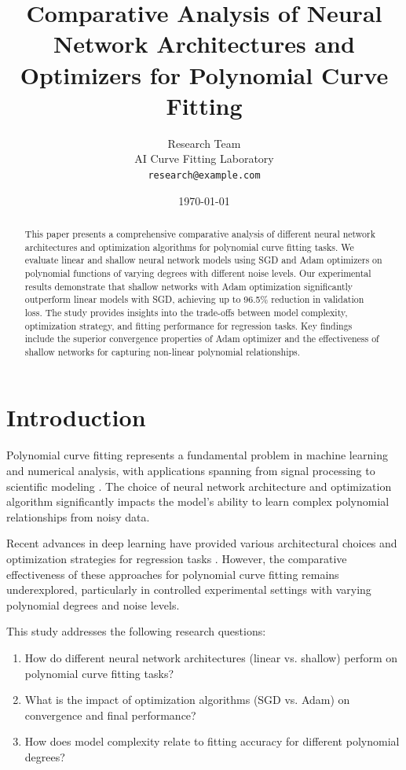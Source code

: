 \documentclass[11pt,twocolumn]{article}
\title{Comparative Analysis of Neural Network Architectures and Optimizers for Polynomial Curve Fitting}
\author{
    Research Team\\
    AI Curve Fitting Laboratory\\
    \texttt{research@example.com}
}
\date{\today}
\begin{document}
\maketitle

\begin{abstract}
This paper presents a comprehensive comparative analysis of different neural network architectures and optimization algorithms for polynomial curve fitting tasks. We evaluate linear and shallow neural network models using SGD and Adam optimizers on polynomial functions of varying degrees with different noise levels. Our experimental results demonstrate that shallow networks with Adam optimization significantly outperform linear models with SGD, achieving up to 96.5\% reduction in validation loss. The study provides insights into the trade-offs between model complexity, optimization strategy, and fitting performance for regression tasks. Key findings include the superior convergence properties of Adam optimizer and the effectiveness of shallow networks for capturing non-linear polynomial relationships.
\end{abstract}

\section{Introduction}

Polynomial curve fitting represents a fundamental problem in machine learning and numerical analysis, with applications spanning from signal processing to scientific modeling \cite{bishop2006pattern}. The choice of neural network architecture and optimization algorithm significantly impacts the model's ability to learn complex polynomial relationships from noisy data.

Recent advances in deep learning have provided various architectural choices and optimization strategies for regression tasks \cite{goodfellow2016deep}. However, the comparative effectiveness of these approaches for polynomial curve fitting remains underexplored, particularly in controlled experimental settings with varying polynomial degrees and noise levels.

This study addresses the following research questions:
\begin{enumerate}
    \item How do different neural network architectures (linear vs. shallow) perform on polynomial curve fitting tasks?
    \item What is the impact of optimization algorithms (SGD vs. Adam) on convergence and final performance?
    \item How does model complexity relate to fitting accuracy for different polynomial degrees?
\end{enumerate}
\end{document}
